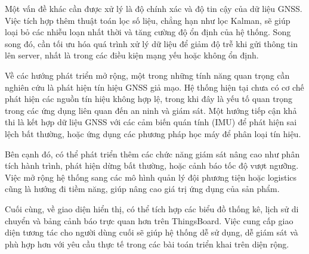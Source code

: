 \documentclass[../DoAn.tex]{subfiles}
\begin{document}
Một vấn đề khác cần được xử lý là độ chính xác và độ tin cậy của dữ liệu GNSS. Việc tích hợp thêm thuật toán lọc số liệu, chẳng hạn như lọc Kalman, sẽ giúp loại bỏ các nhiễu loạn nhất thời và tăng cường độ ổn định của hệ thống. Song song đó, cần tối ưu hóa quá trình xử lý dữ liệu để giảm độ trễ khi gửi thông tin lên server, nhất là trong các điều kiện mạng yếu hoặc không ổn định.

Về các hướng phát triển mở rộng, một trong những tính năng quan trọng cần nghiên cứu là phát hiện tín hiệu GNSS giả mạo. Hệ thống hiện tại chưa có cơ chế phát hiện các nguồn tín hiệu không hợp lệ, trong khi đây là yếu tố quan trọng trong các ứng dụng liên quan đến an ninh và giám sát. Một hướng tiếp cận khả thi là kết hợp dữ liệu GNSS với các cảm biến quán tính (IMU) để phát hiện sai lệch bất thường, hoặc ứng dụng các phương pháp học máy để phân loại tín hiệu.

Bên cạnh đó, có thể phát triển thêm các chức năng giám sát nâng cao như phân tích hành trình, phát hiện dừng bất thường, hoặc cảnh báo tốc độ vượt ngưỡng. Việc mở rộng hệ thống sang các mô hình quản lý đội phương tiện hoặc logistics cũng là hướng đi tiềm năng, giúp nâng cao giá trị ứng dụng của sản phẩm.

Cuối cùng, về giao diện hiển thị, có thể tích hợp các biểu đồ thống kê, lịch sử di chuyển và bảng cảnh báo trực quan hơn trên ThingsBoard. Việc cung cấp giao diện tương tác cho người dùng cuối sẽ giúp hệ thống dễ sử dụng, dễ giám sát và phù hợp hơn với yêu cầu thực tế trong các bài toán triển khai trên diện rộng.
\end{document}
